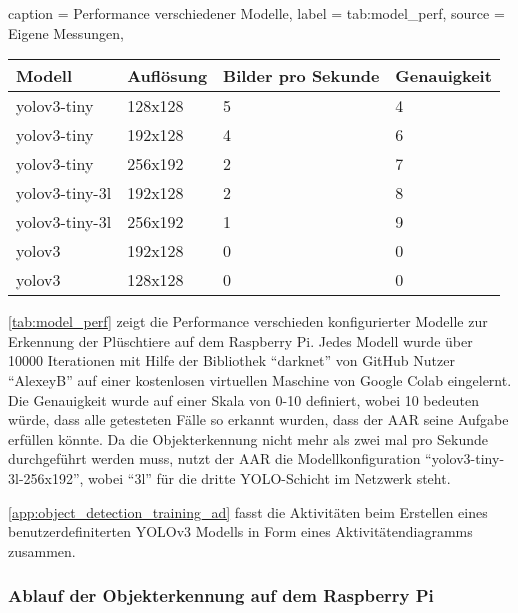 \begin{dhbwtable}{%
    caption	= Performance verschiedener Modelle,
    label	= tab:model_perf,
    source	= Eigene Messungen,
}
    \begin{tabular}{llll}
        \toprule
        \textbf{Modell}     & \textbf{Auflösung}    & \textbf{Bilder pro Sekunde}   & \textbf{Genauigkeit}\\\midrule
        yolov3-tiny         & 128x128               & 5                             & 4\\
        yolov3-tiny         & 192x128               & 4                             & 6\\
        yolov3-tiny         & 256x192               & 2                             & 7\\
        yolov3-tiny-3l      & 192x128               & 2                             & 8\\
        yolov3-tiny-3l      & 256x192               & 1                             & 9\\
        yolov3              & 192x128               & 0                             & 0\\
        yolov3              & 128x128               & 0                             & 0\\\bottomrule
    \end{tabular}    
\end{dhbwtable}

\autoref{tab:model_perf} zeigt die Performance verschieden konfigurierter Modelle zur Erkennung der Plüschtiere auf dem Raspberry Pi.
Jedes Modell wurde über 10000 Iterationen mit Hilfe der Bibliothek \enquote{darknet} von GitHub Nutzer \enquote{AlexeyB} auf einer kostenlosen virtuellen Maschine von Google Colab eingelernt.
Die Genauigkeit wurde auf einer Skala von 0-10 definiert, wobei 10 bedeuten würde, dass alle getesteten Fälle so erkannt wurden, dass der \ac{AAR} seine Aufgabe erfüllen könnte.
Da die Objekterkennung nicht mehr als zwei mal pro Sekunde durchgeführt werden muss, nutzt der \ac{AAR} die Modellkonfiguration \enquote{yolov3-tiny-3l-256x192}, wobei \enquote{3l} für die dritte \ac{YOLO}-Schicht im Netzwerk steht.

\autoref{app:object_detection_training_ad} fasst die Aktivitäten beim 
Erstellen eines benutzerdefiniterten \ac{YOLO}v3 Modells in Form eines Aktivitätendiagramms zusammen.

\subsubsection{Ablauf der Objekterkennung auf dem Raspberry Pi}

